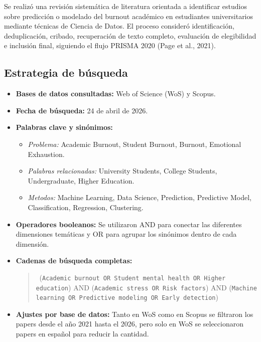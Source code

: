 \documentclass[12pt,a4paper]{article}
\begin{document}
Se realizó una revisión sistemática de literatura orientada a identificar estudios sobre predicción o modelado del burnout académico en estudiantes universitarios mediante técnicas de Ciencia de Datos. El proceso consideró identificación, deduplicación, cribado, recuperación de texto completo, evaluación de elegibilidad e inclusión final, siguiendo el flujo PRISMA 2020 (Page et al., 2021).

\subsection{Estrategia de búsqueda}

\begin{itemize}

    \item \textbf{Bases de datos consultadas:} Web of Science (WoS) y Scopus.

    \item \textbf{Fecha de búsqueda:} 24 de abril de 2026.

    \item \textbf{Palabras clave y sinónimos:}

    \begin{itemize}
        \item \textit{Problema:} Academic Burnout, Student Burnout, Burnout, Emotional Exhaustion.
        
        \item \textit{Palabras relacionadas:} University Students, College Students, Undergraduate, Higher Education.
        
        \item \textit{Metodos:} Machine Learning, Data Science, Prediction, Predictive Model, Classification, Regression, Clustering.
    \end{itemize}

    \item \textbf{Operadores booleanos:} Se utilizaron AND para conectar las diferentes dimensiones temáticas y OR para agrupar los sinónimos dentro de cada dimensión.

    \item \textbf{Cadenas de búsqueda completas:}
    \begin{quote}\
    (\texttt{Academic burnout OR Student mental health OR Higher education}) AND 
    (\texttt{Academic stress OR Risk factors}) AND 
    (\texttt{Machine learning OR Predictive modeling OR Early detection})
    \end{quote}

    \item \textbf{Ajustes por base de datos:} Tanto en WoS como en Scopus se filtraron los papers desde el año 2021 hasta el 2026, pero solo en WoS se seleccionaron papers en español para reducir la cantidad.

\end{itemize}
\end{document}
